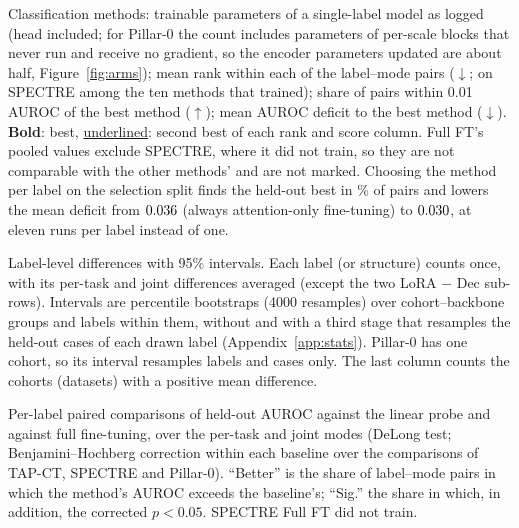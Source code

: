 \begin{table}[H]
\centering
\caption{Classification methods: trainable parameters of a single-label model as logged (head included; for Pillar-0 the count includes parameters of per-scale blocks that never run and receive no gradient, so the encoder parameters updated are about half, Figure~\ref{fig:arms}); mean rank within each of the \numRankSlotsN{} label--mode pairs ($\downarrow$; on SPECTRE among the ten methods that trained); share of pairs within 0.01 AUROC of the best method ($\uparrow$); mean AUROC deficit to the best method ($\downarrow$). \textbf{Bold}: best, \underline{underlined}: second best of each rank and score column. Full FT's pooled values exclude SPECTRE, where it did not train, so they are not comparable with the other methods' and are not marked. Choosing the method per label on the selection split finds the held-out best in \numSelectHit\% of pairs and lowers the mean deficit from $\numRegretAttnft$ (always attention-only fine-tuning) to $\numSelectRegret$, at eleven runs per label instead of one.}
\label{tab:methods}
\end{table}

\begin{table}[H]
\centering
\caption{Label-level differences with 95\% intervals. Each label (or structure) counts once, with its per-task and joint differences averaged (except the two LoRA $-$ Dec sub-rows). Intervals are percentile bootstraps (4000 resamples) over cohort--backbone groups and labels within them, without and with a third stage that resamples the held-out cases of each drawn label (Appendix~\ref{app:stats}). Pillar-0 has one cohort, so its interval resamples labels and cases only. The last column counts the cohorts (datasets) with a positive mean difference.}
\label{tab:cis}
\end{table}

\begin{table}[H]
\centering
\caption{Per-label paired comparisons of held-out AUROC against the linear probe and against full fine-tuning, over the per-task and joint modes (DeLong test; Benjamini--Hochberg correction within each baseline over the comparisons of TAP-CT, SPECTRE and Pillar-0). ``Better'' is the share of label--mode pairs in which the method's AUROC exceeds the baseline's; ``Sig.'' the share in which, in addition, the corrected $p<0.05$. SPECTRE Full FT did not train.}
\label{tab:paired}
\end{table}

